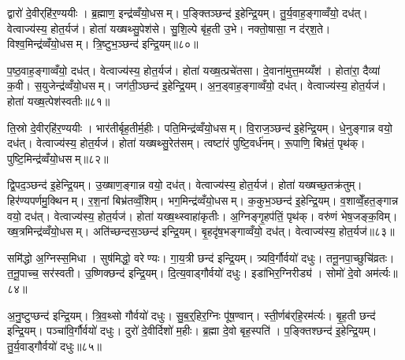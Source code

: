 द्वारो॑ दे॒वीर्‌हि॑र॒ण्ययीः। ब्र॒ह्माण॒ इन्द्र॑व्वँयो॒धसम्। प॒ङ्क्तिञ्छन्द॑ इ॒हेन्द्रि॒यम्। तु॒र्य॒वाह॒ङ्गाव्वँयो॒ दध॑त्। वेत्वाज्य॑स्य॒ होत॒र्यज॑। होता॑ यख्षथ्सु॒पेश॑से। सु॒शि॒ल्पे बृ॑ह॒ती उ॒भे। नक्तो॒षासा॒ न द॑र्‌श॒ते। विश्व॒मिन्द्र॑व्वँयो॒धसम्। त्रि॒ष्टुभ॒ञ्छन्द॑ इन्द्रि॒यम्॥८०॥

प॒ष्ठ॒वाह॒ङ्गाव्वँयो॒ दध॑त्। वेत्वाज्य॑स्य॒ होत॒र्यज॑। होता॑ यख्ष॒त्प्रचे॑तसा। दे॒वाना॑मुत्त॒मय्यँश॑। होता॑रा॒ दैव्या॑ क॒वी। स॒युजेन्द्र॑व्वँयो॒धसम्। जग॑ती॒ञ्छन्द॑ इ॒हेन्द्रि॒यम्। अ॒न॒ड्वाह॒ङ्गाव्वँयो॒ दध॑त्। वेत्वाज्य॑स्य॒ होत॒र्यज॑। होता॑ यख्ष॒त्पेश॑स्वतीः॥८१॥

ति॒स्रो दे॒वीर्‌हि॑र॒ण्ययीः। भार॑तीर्बृह॒तीर्म॒हीः। पति॒मिन्द्र॑व्वँयो॒धसम्। वि॒राज॒ञ्छन्द॑ इ॒हेन्द्रि॒यम्। धे॒नुङ्गान्न वयो॒ दध॑त्। वेत्वाज्य॑स्य॒ होत॒र्यज॑। होता॑ यख्षथ्सु॒रेत॑सम्। त्वष्टा॑रं पुष्टि॒वर्ध॑नम्। रू॒पाणि॒ बिभ्र॑तं॒ पृथ॑क्। पुष्टि॒मिन्द्र॑व्वँयो॒धसम्॥८२॥

द्वि॒पद॒ञ्छन्द॑ इ॒हेन्द्रि॒यम्। उ॒ख्षाण॒ङ्गान्न वयो॒ दध॑त्। वेत्वाज्य॑स्य॒ होत॒र्यज॑। होता॑ यख्षच्छ॒तक्र॑तुम्। हिर॑ण्यपर्णमु॒क्थिनम्। र॒श॒नां बिभ्र॑तव्वँ॒शिम्। भग॒मिन्द्र॑व्वँयो॒धसम्। क॒कुभ॒ञ्छन्द॑ इ॒हेन्द्रि॒यम्। व॒शाव्वेँ॒हत॒ङ्गान्न वयो॒ दध॑त्। वेत्वाज्य॑स्य॒ होत॒र्यज॑। होता॑ यख्ष॒थ्स्वाहा॑कृतीः। अ॒ग्निङ्गृ॒हप॑तिं॒ पृथ॑क्। वरु॑णं भेष॒जङ्क॒विम्। ख्ष॒त्रमिन्द्र॑व्वँयो॒धसम्। अति॑च्छन्दस॒ञ्छन्द॑ इन्द्रि॒यम्। बृ॒हदृ॑ष॒भङ्गाव्वँयो॒ दध॑त्। वेत्वाज्य॑स्य॒ होत॒र्यज॑॥८३॥

समि॑द्धो अ॒ग्निस्स॒मिधा। सुष॑मिद्धो॒ वरेण्यः। गा॒य॒त्री छन्द॑ इन्द्रि॒यम्। त्र्यवि॒र्गौर्वयो॑ दधुः। तनू॒नपा॒च्छुचि॑व्रतः। त॒नू॒पाच्च॒ सर॑स्वती। उ॒ष्णिक्छन्द॑ इन्द्रि॒यम्। दि॒त्य॒वाड्गौर्वयो॑ दधुः। इडा॑भिर॒ग्निरीड्य॑। सोमो॑ दे॒वो अम॑र्त्यः॥८४॥

अ॒नु॒ष्टुप्छन्द॑ इन्द्रि॒यम्। त्रि॒व॒थ्सो गौर्वयो॑ दधुः। सु॒ब॒र्॒हिर॒ग्निः पू॑ष॒ण्वान्। स्ती॒र्णब॑र्‌हि॒रम॑र्त्यः। बृ॒ह॒ती छन्द॑ इन्द्रि॒यम्। पञ्चा॑वि॒र्गौर्वयो॑ दधुः। दुरो॑ दे॒वीर्दिशो॑ म॒हीः। ब्र॒ह्मा दे॒वो बृह॒स्पति॑। प॒ङ्क्तिश्छन्द॑ इ॒हेन्द्रि॒यम्। तु॒र्य॒वाड्गौर्वयो॑ दधुः॥८५॥

